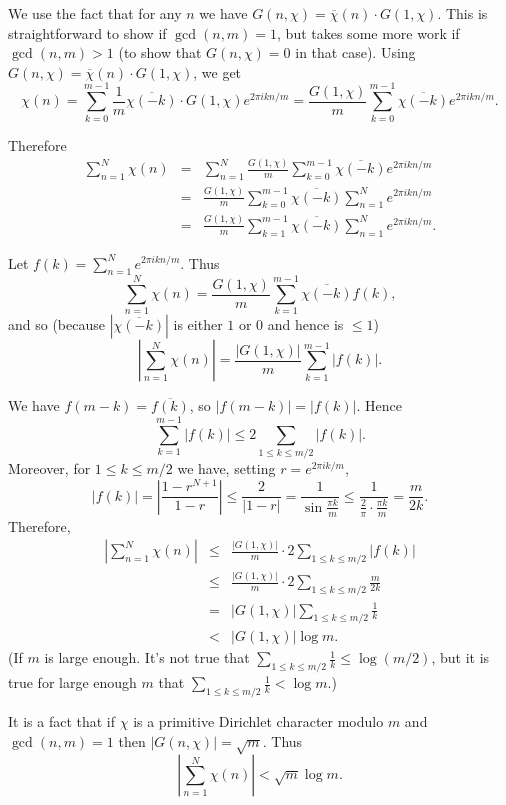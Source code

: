 \documentclass{article}
\begin{document}
We use the fact \cite[p.~152, Proposition~9]{schoiss} that for any $n$ we have $G(n,\chi)=\overline{\chi}(n)\cdot G(1,\chi)$. This is straightforward to show if $\gcd(n,m)=1$, but takes some more
work if $\gcd(n,m)>1$ (to show that $G(n,\chi)=0$ in that case). Using $G(n,\chi)=\overline{\chi}(n)\cdot G(1,\chi)$, we get
\[
\chi(n)=\sum_{k=0}^{m-1} \frac{1}{m}\overline{\chi(-k)} \cdot G(1,\chi)e^{2\pi ikn/m}=\frac{G(1,\chi)}{m} \sum_{k=0}^{m-1} \overline{\chi(-k)}e^{2\pi ikn/m}.
\]


Therefore
\begin{eqnarray*}
\sum_{n=1}^N \chi(n)&=&\sum_{n=1}^N \frac{G(1,\chi)}{m} \sum_{k=0}^{m-1} \overline{\chi(-k)}e^{2\pi ikn/m}\\
&=&\frac{G(1,\chi)}{m} \sum_{k=0}^{m-1} \overline{\chi(-k)} \sum_{n=1}^N e^{2\pi ikn/m}\\
&=&\frac{G(1,\chi)}{m} \sum_{k=1}^{m-1} \overline{\chi(-k)} \sum_{n=1}^N e^{2\pi ikn/m}.
\end{eqnarray*}

Let $f(k)=\sum_{n=1}^N e^{2\pi ikn/m}$.
Thus
\[
\sum_{n=1}^N \chi(n)=\frac{G(1,\chi)}{m} \sum_{k=1}^{m-1} \overline{\chi(-k)} f(k),
\]
and so (because  $|\overline{\chi(-k)}|$ is either $1$ or $0$ and hence is $\leq 1$)
\[
\left| \sum_{n=1}^N \chi(n) \right|=\frac{|G(1,\chi)|}{m} \sum_{k=1}^{m-1}|f(k)|.
\]

We have $f(m-k)=\overline{f(k)}$, so $|f(m-k)|=|f(k)|$. Hence
\[
\sum_{k=1}^{m-1} |f(k)| \leq 2 \sum_{1 \leq k \leq m/2} |f(k)|.
\]
Moreover, for $1 \leq k \leq m/2$ we have, setting $r=e^{2\pi ik/m}$,
\[
|f(k)|=\left|\frac{1-r^{N+1}}{1-r} \right| \leq \frac{2}{|1-r|}=\frac{1}{\sin \frac{\pi k}{m}} \leq \frac{1}{\frac{2}{\pi} \cdot \frac{\pi k}{m}}=\frac{m}{2k}.
\]
Therefore,
\begin{eqnarray*}
\left| \sum_{n=1}^N \chi(n) \right| &\leq& \frac{|G(1,\chi)|}{m} \cdot 2 \sum_{1 \leq k \leq m/2} |f(k)|\\
&\leq& \frac{|G(1,\chi)|}{m} \cdot 2 \sum_{1 \leq k \leq m/2} \frac{m}{2k}\\
&=&|G(1,\chi)| \sum_{1 \leq k \leq m/2} \frac{1}{k}\\
&<&|G(1,\chi)| \log m.
\end{eqnarray*}
(If $m$ is large enough. It's not true that $\sum_{1 \leq k \leq m/2} \frac{1}{k} \leq \log (m/2)$, but it is true for large enough $m$ that $\sum_{1 \leq k \leq m/2} \frac{1}{k} < \log m$.)

It is a fact \cite[p.~154, Proposition~10]{schoiss} that if $\chi$ is a primitive Dirichlet character modulo $m$ and $\gcd(n,m)=1$ then $|G(n,\chi)|=\sqrt{m}$. Thus
\[
\left| \sum_{n=1}^N \chi(n) \right|  < \sqrt{m} \log m.
\]



\end{document}
